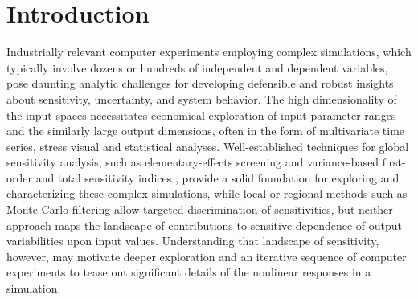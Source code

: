 \documentclass[12pt]{article}
\begin{document}
\newpage


\section{Introduction}
\label{sec:intro}

Industrially relevant computer experiments employing complex simulations, which typically involve dozens or hundreds of independent and dependent variables, pose daunting analytic challenges for developing defensible and robust insights about sensitivity, uncertainty, and system behavior. The high dimensionality of the input spaces necessitates economical exploration of input-parameter ranges and the similarly large output dimensions, often in the form of multivariate time series, stress visual and statistical analyses. Well-established techniques for global sensitivity analysis, such as elementary-effects screening and variance-based first-order and total sensitivity indices \citep{saltelli_global_2008}, provide a solid foundation for exploring and characterizing these complex simulations, while local or regional methods such as Monte-Carlo filtering \citep{borgonovo_sensitivity_2016} allow targeted discrimination of sensitivities, but neither approach maps the landscape of contributions to sensitive dependence of output variabilities upon input values. Understanding that landscape of sensitivity, however, may motivate deeper exploration and an iterative sequence of computer experiments to tease out significant details of the nonlinear responses in a simulation.
\end{document}
